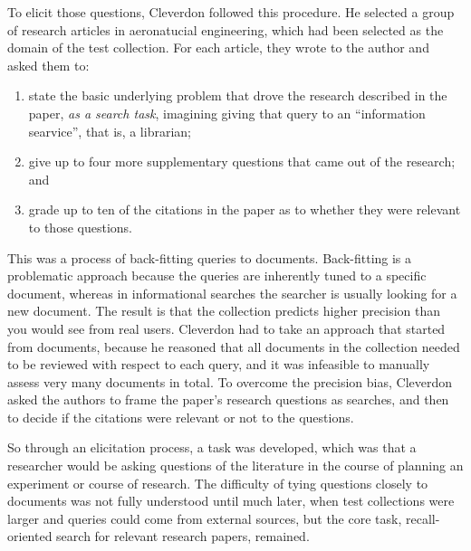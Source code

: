 \documentclass[nobib]{tufte-book}
\begin{document}
To elicit those questions, Cleverdon followed this procedure.  He selected a group of research articles in aeronatucial engineering, which had been selected as the domain of the test collection.  For each article, they wrote to the author and asked them to:
\begin{enumerate}
    \item state the basic underlying problem that drove the research described in the paper, {\em as a search task}, imagining giving that query to an ``information searvice'', that is, a librarian;
    \item give up to four more supplementary questions that came out of the research; and
    \item grade up to ten of the citations in the paper as to whether they were relevant to those questions.
\end{enumerate}

This was a process of back-fitting queries to documents.  Back-fitting is a problematic approach because the queries are inherently tuned to a specific document, whereas in informational searches the searcher is usually looking for a new document.  The result is that the collection predicts higher precision than you would see from real users. 
Cleverdon had to take an approach that started from documents, because he reasoned that all documents in the collection needed to be reviewed with respect to each query, and it was infeasible to manually assess very many documents in total.
To overcome the precision bias, Cleverdon asked the authors to frame the paper's research questions as searches, and then to decide if the citations were relevant or not to the questions.

So through an elicitation process, a task was developed, which was that a researcher would be asking questions of the literature in the course of planning an experiment or course of research.  The difficulty of tying questions closely to documents was not fully understood until much later, when test collections were larger and queries could come from external sources, but the core task, recall-oriented search for relevant research papers, remained.
\end{document}
